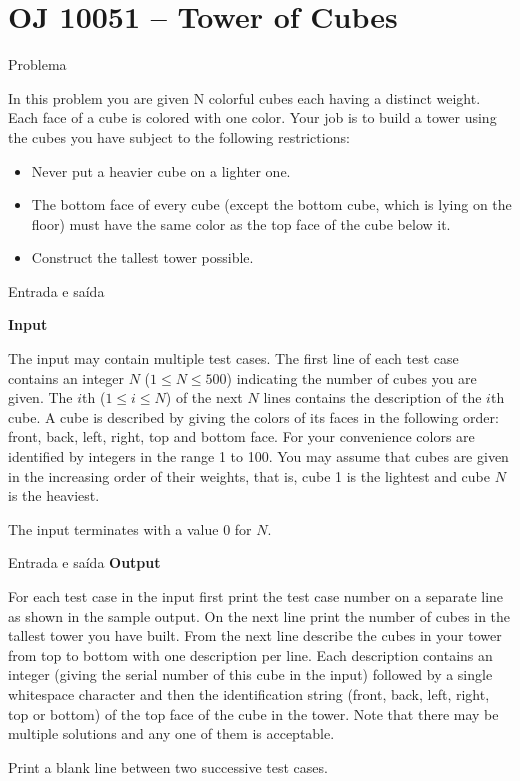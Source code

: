 \section{OJ 10051 -- Tower of Cubes}

\begin{frame}[fragile]{Problema}

In this problem you are given N colorful cubes each having a distinct weight. Each face of a 
cube is colored with one color. Your job is to build a tower using the cubes you have subject 
to the following restrictions:

\begin{itemize}
    \item Never put a heavier cube on a lighter one.
    \item The bottom face of every cube (except the bottom cube, which is lying on the floor) 
        must have the same color as the top face of the cube below it.
    \item Construct the tallest tower possible.
\end{itemize}

\end{frame}

\begin{frame}[fragile]{Entrada e saída}

\textbf{Input}

The input may contain multiple test cases. The first line of each test case contains an integer
$N$ ($1\leq N\leq 500$) indicating the number of cubes you are given. The $i$th ($1\leq i\leq 
N$)
of the next $N$ lines contains the description of the $i$th cube. A cube is described by giving 
the colors of its faces in the following order: front, back, left, right, top and bottom face. 
For your convenience colors are identified by integers in the range 1 to 100. You may assume 
that cubes are given in the increasing order of their weights, that is, cube 1 is the lightest 
and cube $N$ is the heaviest.

The input terminates with a value 0 for $N$.

\end{frame}

\begin{frame}[fragile]{Entrada e saída}
\textbf{Output}

For each test case in the input first print the test case number on a separate line as shown 
in the sample output. On the next line print the number of cubes in the tallest tower you have 
built. From the next line describe the cubes in your tower from top to bottom with one 
description per line. Each description contains an integer (giving the serial number of this 
cube in the input) followed by a single whitespace character and then the identification string 
(front, back, left, right, top or bottom) of the top face of the cube in the tower. Note that 
there may be multiple solutions and any one of them is acceptable.

Print a blank line between two successive test cases.
\end{frame}

